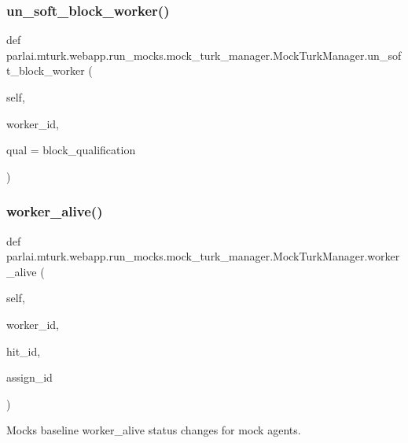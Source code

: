 \subsubsection{\texorpdfstring{un\+\_\+soft\+\_\+block\+\_\+worker()}{un\_soft\_block\_worker()}}
{\footnotesize\ttfamily def parlai.\+mturk.\+webapp.\+run\+\_\+mocks.\+mock\+\_\+turk\+\_\+manager.\+Mock\+Turk\+Manager.\+un\+\_\+soft\+\_\+block\+\_\+worker (\begin{DoxyParamCaption}\item[{}]{self,  }\item[{}]{worker\+\_\+id,  }\item[{}]{qual = {\ttfamily \textquotesingle{}block\+\_\+qualification\textquotesingle{}} }\end{DoxyParamCaption})}

\mbox{\label{classparlai_1_1mturk_1_1webapp_1_1run__mocks_1_1mock__turk__manager_1_1MockTurkManager_a0de1a403e413421953de31fcb9033d8f}} 
\subsubsection{\texorpdfstring{worker\+\_\+alive()}{worker\_alive()}}
{\footnotesize\ttfamily def parlai.\+mturk.\+webapp.\+run\+\_\+mocks.\+mock\+\_\+turk\+\_\+manager.\+Mock\+Turk\+Manager.\+worker\+\_\+alive (\begin{DoxyParamCaption}\item[{}]{self,  }\item[{}]{worker\+\_\+id,  }\item[{}]{hit\+\_\+id,  }\item[{}]{assign\+\_\+id }\end{DoxyParamCaption})}

\begin{DoxyVerb}Mocks baseline worker_alive status changes for mock agents.
\end{DoxyVerb}
 

